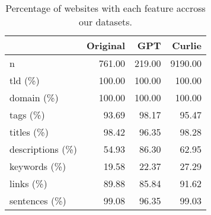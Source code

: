 \begin{table}[h!]
\centering
\caption{Percentage of websites with each feature accross our datasets.}
\label{tab:feature_information}
\begin{tabular}{lrrr}
\toprule
 & Original & GPT & Curlie \\
\midrule
n & 761.00 & 219.00 & 9190.00 \\
tld (\%) & 100.00 & 100.00 & 100.00 \\
domain (\%) & 100.00 & 100.00 & 100.00 \\
tags (\%) & 93.69 & 98.17 & 95.47 \\
titles (\%) & 98.42 & 96.35 & 98.28 \\
descriptions (\%) & 54.93 & 86.30 & 62.95 \\
keywords (\%) & 19.58 & 22.37 & 27.29 \\
links (\%) & 89.88 & 85.84 & 91.62 \\
sentences (\%) & 99.08 & 96.35 & 99.03 \\
\bottomrule
\end{tabular}
\end{table}
